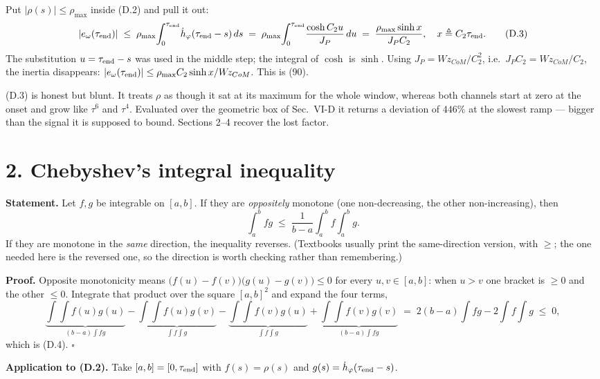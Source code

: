\documentclass[11pt]{article}
\newcommand{\Wz}{W\!z_{CoM}}
\newcommand{\te}{\tau_{\rm end}}
\newcommand{\rmax}{\rho_{\max}}
\begin{document}
Put $|\rho(s)|\le\rmax$ inside (D.2) and pull it out:
\begin{equation}
  |e_\omega(\te)| \;\le\; \rmax\!\int_0^{\te}\!\dot h_\varphi(\te-s)\,ds
  \;=\; \rmax\!\int_0^{\te}\!\frac{\cosh C_2u}{J_P}\,du
  \;=\; \frac{\rmax\sinh x}{J_PC_2},
  \quad x \triangleq C_2\te .
  \tag{D.3}
\end{equation}
The substitution $u = \te - s$ was used in the middle step; the
integral of $\cosh$ is $\sinh$. Using $J_P = \Wz/C_2^{2}$, i.e.\
$J_PC_2 = \Wz/C_2$, the inertia disappears:
$|e_\omega(\te)| \le \rmax C_2\sinh x/\Wz$. This is (90).

(D.3) is honest but blunt. It treats $\rho$ as though it sat at its
maximum for the whole window, whereas both channels start at zero at
the onset and grow like $\tau^6$ and $\tau^4$. Evaluated over the
geometric box of Sec.~VI-D it returns a deviation of $446\%$ at the
slowest ramp --- bigger than the signal it is supposed to bound. Sections 2--4
recover the lost factor.

\section*{2. Chebyshev's integral inequality}

\textbf{Statement.} Let $f,g$ be integrable on $[a,b]$. If they are
\emph{oppositely} monotone (one non-decreasing, the other
non-increasing), then
\begin{equation}
  \int_a^b\! fg \;\le\; \frac{1}{b-a}\int_a^b\! f \int_a^b\! g .
  \tag{D.4}
\end{equation}
If they are monotone in the \emph{same} direction, the inequality
reverses. (Textbooks usually print the same-direction version, with
$\ge$; the one needed here is the reversed one, so the direction is
worth checking rather than remembering.)

\textbf{Proof.} Opposite monotonicity means
$\bigl(f(u)-f(v)\bigr)\bigl(g(u)-g(v)\bigr)\le0$ for every
$u,v\in[a,b]$: when $u>v$ one bracket is $\ge0$ and the other $\le0$.
Integrate that product over the square $[a,b]^2$ and expand the four
terms,
\[
  \underbrace{\int\!\!\int f(u)g(u)}_{(b-a)\int fg}
  - \underbrace{\int\!\!\int f(u)g(v)}_{\int f\int g}
  - \underbrace{\int\!\!\int f(v)g(u)}_{\int f\int g}
  + \underbrace{\int\!\!\int f(v)g(v)}_{(b-a)\int fg}
  \;=\; 2(b-a)\!\int\! fg - 2\!\int\! f\!\int\! g \;\le\; 0,
\]
which is (D.4). $\square$

\textbf{Application to (D.2).} Take $[a,b] = [0,\te]$ with
$f(s) = \rho(s)$ and $g(s) = \dot h_\varphi(\te-s)$.
\end{document}

